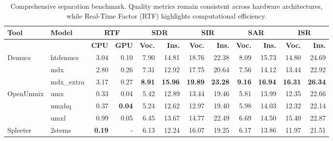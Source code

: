 \begin{table}[htbp]
\centering
\caption{Comprehensive separation benchmark. Quality metrics remain consistent across hardware architectures, while Real-Time Factor (RTF) highlights computational efficiency.}
\label{tab:separation_results}
\setlength{\tabcolsep}{3.5pt}
\footnotesize
\begin{tabular}{llrrrrrrrrrr}
\hline
\textbf{Tool} & \textbf{Model} & \multicolumn{2}{c}{\textbf{RTF}} & \multicolumn{2}{c}{\textbf{SDR}} & \multicolumn{2}{c}{\textbf{SIR}} & \multicolumn{2}{c}{\textbf{SAR}} & \multicolumn{2}{c}{\textbf{ISR}} \\ 
\hline
 & & \textbf{CPU} & \textbf{GPU} & \textbf{Voc.} & \textbf{Ins.} & \textbf{Voc.} & \textbf{Ins.} & \textbf{Voc.} & \textbf{Ins.} & \textbf{Voc.} & \textbf{Ins.} \\ 
\hline
Demucs & htdemucs & 3.04 & 0.10 & 7.90 & 14.81 & 18.76 & 22.38 & 8.09 & 15.73 & 14.80 & 24.69 \\
 & mdx & 2.80 & 0.26 & 7.31 & 12.92 & 17.75 & 20.64 & 7.56 & 14.12 & 13.44 & 22.92 \\
 & mdx\_extra & 3.17 & 0.27 & \textbf{8.91} & \textbf{15.96} & \textbf{19.89} & \textbf{23.28} & \textbf{9.16} & \textbf{16.94} & \textbf{16.31} & \textbf{26.34} \\
\hline
OpenUnmix & umx & 0.33 & 0.04 & 5.42 & 12.89 & 13.44 & 19.46 & 5.81 & 13.99 & 12.35 & 22.66 \\
 & umxhq & 0.37 & \textbf{0.04} & 5.24 & 12.62 & 12.97 & 19.40 & 5.98 & 14.03 & 12.32 & 22.14 \\
 & umxl & 0.99 & 0.05 & 6.45 & 13.67 & 14.77 & 22.49 & 6.69 & 14.50 & 15.40 & 22.87 \\
\hline
Spleeter & 2stems & \textbf{0.19} & - & 6.13 & 12.24 & 16.07 & 19.25 & 6.17 & 13.86 & 11.97 & 21.51 \\
\hline
\end{tabular}
\end{table}